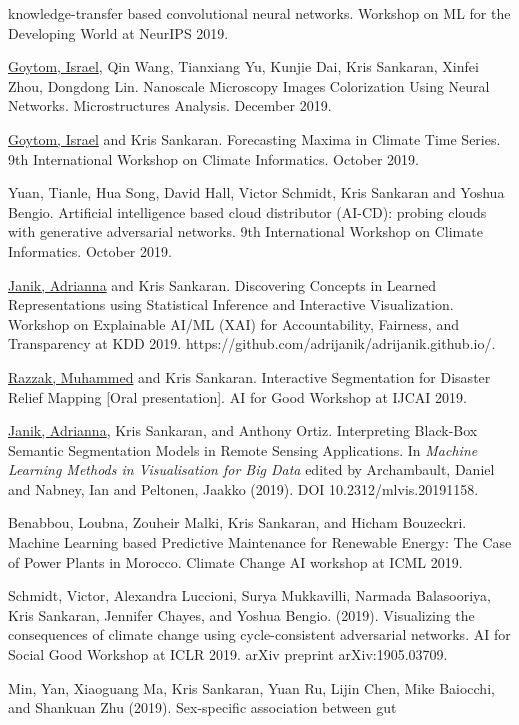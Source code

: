 \documentclass[letterpaper]{article}
\renewenvironment{itemize}{
  \begin{list}{}{
    \setlength{\leftmargin}{1.5em}
  }
}{
  \end{list}
}
\begin{document}
\begin{itemize}
knowledge-transfer based convolutional neural networks. Workshop on ML for the
Developing World at NeurIPS 2019.
\item \underline{Goytom, Israel}, Qin Wang, Tianxiang Yu, Kunjie Dai, Kris
Sankaran, Xinfei Zhou, Dongdong Lin. Nanoscale Microscopy Images Colorization
Using Neural Networks. Microstructures Analysis. December 2019.
\item \underline{Goytom, Israel} and Kris Sankaran. Forecasting Maxima in
Climate Time Series. 9th International Workshop on Climate Informatics.
October 2019.
\item Yuan, Tianle, Hua Song, David Hall, Victor Schmidt, Kris Sankaran and
  Yoshua Bengio. Artificial intelligence based cloud distributor (AI-CD):
  probing clouds with generative adversarial networks. 9th International
  Workshop on Climate Informatics. October 2019.
\item \underline{Janik, Adrianna} and Kris Sankaran. Discovering Concepts in
Learned Representations using Statistical Inference and Interactive
Visualization. Workshop on Explainable AI/ML (XAI) for Accountability,
Fairness, and Transparency at KDD 2019.
https://github.com/adrijanik/adrijanik.github.io/.
\item \underline{Razzak, Muhammed} and Kris Sankaran. Interactive Segmentation
for Disaster Relief Mapping [Oral presentation]. AI for Good Workshop at IJCAI
2019.
\item \underline{Janik, Adrianna}, Kris Sankaran, and Anthony Ortiz.
Interpreting Black-Box Semantic Segmentation Models in Remote Sensing
Applications. In \textit{Machine Learning Methods in Visualisation for Big
Data} edited by Archambault, Daniel and Nabney, Ian and Peltonen, Jaakko
(2019). DOI 10.2312/mlvis.20191158.
\item Benabbou, Loubna, Zouheir Malki, Kris Sankaran, and Hicham Bouzeckri.
  Machine Learning based Predictive Maintenance for Renewable Energy: The Case
  of Power Plants in Morocco. Climate Change AI workshop at ICML 2019.
\item Schmidt, Victor, Alexandra Luccioni, Surya Mukkavilli, Narmada
  Balasooriya, Kris Sankaran, Jennifer Chayes, and Yoshua Bengio. (2019).
  Visualizing the consequences of climate change using cycle-consistent
  adversarial networks. AI for Social Good Workshop at ICLR 2019. arXiv
  preprint arXiv:1905.03709.
\item Min, Yan, Xiaoguang Ma, Kris Sankaran, Yuan Ru, Lijin Chen, Mike
  Baiocchi, and Shankuan Zhu (2019). Sex-specific association between gut

\end{itemize}
\end{document}
